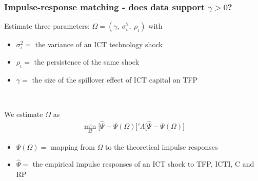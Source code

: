 \documentclass{beamer}
\begin{document}
\begin{frame}
	\frametitle{Impulse-response matching - does data support $\gamma>0$?}
	
Estimate three parameters: $\Omega = (\gamma, \ \sigma_{\iota}^2, \ \rho_{\iota})$ with

\begin{itemize}
\item $\sigma_{\iota}^2 =$ the variance of an ICT technology shock
\item $\rho_{\iota}=$ the persistence of the same shock
\item $\gamma=$  the size of the spillover effect of ICT capital on TFP
\end{itemize}


\

We estimate $\Omega$ as
\begin{eqnarray}\label{equation:min_prob_IRmatching}
\min_{\Omega} \big[  \hat{\Psi} - \Psi(\Omega)  \big]' \Lambda \big[  \hat{\Psi} - \Psi(\Omega)  \big]
\end{eqnarray}

\begin{itemize}
\item $\Psi(\Omega) =$ mapping from $\Omega$ to the theoretical impulse responses
\item $\hat{\Psi} =$ the empirical impulse responses of an ICT shock to TFP, ICTI, C and RP
\end{itemize}

\end{frame}
\end{document}
